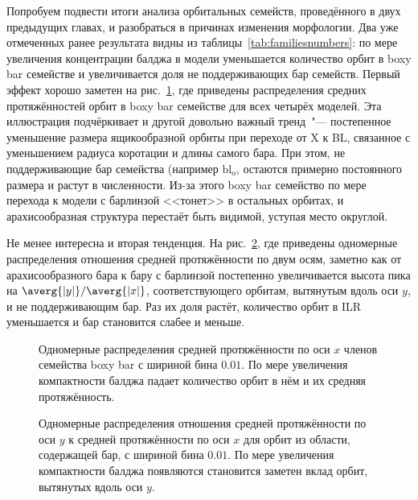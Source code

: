 \documentclass[tikz]{trlnotes}
\begin{document}
Попробуем подвести итоги анализа орбитальных семейств, проведённого в двух предыдущих главах,
и разобраться в причинах изменения морфологии.  Два уже отмеченных ранее результата видны из
таблицы~\ref{tab:familiesnumbers}: по мере увеличения концентрации балджа в модели уменьшается количество орбит в
boxy bar семействе и увеличивается доля не поддерживающих бар семейств.
Первый эффект хорошо заметен на рис.~\ref{fig:boxyamplcomp}, где приведены распределения средних протяжённостей
орбит в boxy bar семействе для всех четырёх моделей. Эта иллюстрация подчёркивает и другой довольно важный
тренд~"--- постепенное уменьшение размера ящикообразной орбиты при переходе от X к BL, связанное
с уменьшением радиуса коротации и длины самого бара. При этом, не поддерживающие бар семейства (например
$\text{bl}_{\text{o}}$, остаются примерно постоянного размера и растут в численности. Из-за этого boxy bar семейство
по мере перехода к модели с барлинзой <<тонет>> в остальных орбитах, и арахисообразная структура перестаёт быть
видимой, уступая место округлой.

Не менее интересна и вторая тенденция. На рис.~\ref{fig:axisratio}, где приведены одномерные распределения
отношения средней протяжённости по двум осям, заметно как от арахисообразного бара к бару с барлинзой 
постепенно увеличивается высота пика на $\averg{|y|}/\averg{|x|}$, соответствующего орбитам, вытянутым вдоль оси
$y$, и не поддерживающим бар. Раз их доля растёт, количество орбит в ILR уменьшается и бар становится слабее и
меньше. 

\begin{figure}[htpb]
  \centering
  \caption{Одномерные распределения средней протяжённости по оси $x$ членов семейства boxy bar с шириной бина $0.01$.
  По мере увеличения компактности балджа падает количество орбит в нём и их средняя протяжённость.}
  \label{fig:boxyamplcomp}
\end{figure}

\begin{figure}[htpb]
  \centering
  \caption{Одномерные распределения отношения средней протяжённости по оси $y$ к средней протяжённости по оси $x$ для орбит из
    области, содержащей бар, с шириной бина $0.01$. По мере увеличения компактности балджа появляются становится заметен вклад орбит,
    вытянутых вдоль оси $y$.}
  \label{fig:axisratio}
\end{figure}
\end{document}

